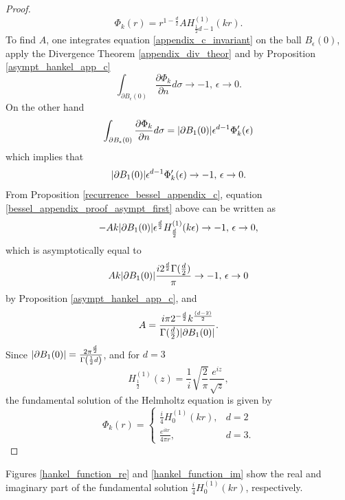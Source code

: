\begin{proof}
    \[
        \Phi_k(r) = r^{1-\frac{d}{2}} A H^{(1)}_{\frac{1}{2}d-1}(kr).
    \]
    To find \(A\), one integrates equation \eqref{appendix_c_invariant} on the ball \(B_\epsilon(0)\), apply the Divergence Theorem \ref{appendix_div_theor} and by Proposition \ref{asympt_hankel_app_c}
    \[
        \int_{\partial B_\epsilon(0)} \frac{\partial \Phi_k}{\partial n}d \sigma \rightarrow -1, \, \epsilon \rightarrow 0.
    \] 
    On the other hand
    \[
        \int_{\partial B_\epsilon(0)} \frac{\partial \Phi_k}{\partial n}d \sigma = \abs{\partial B_1(0)} \epsilon^{d-1}\Phi_k'(\epsilon)
    \]
    which implies that
    \begin{equation}\label{bessel_appendix_proof_asympt_first}
        \abs{\partial B_1(0)} \epsilon^{d-1}\Phi_k'(\epsilon) \rightarrow -1, \, \epsilon \rightarrow 0.
    \end{equation}
    From Proposition \ref{recurrence_bessel_appendix_c}, equation \eqref{bessel_appendix_proof_asympt_first} above can be written as
    \[
        -A k  \abs{\partial B_1(0)} \epsilon^{\frac{d}{2}}H^{(1)}_{\frac{d}{2}}(k \epsilon) \rightarrow -1, \, \epsilon \rightarrow 0,
    \]
    which is asymptotically equal to
    \[
        A k \abs{\partial B_1(0)} \frac{i 2^{\frac{d}{2}} \Gamma(\frac{d}{2})}{\pi}  \rightarrow -1, \, \epsilon \rightarrow 0
    \]
    by Proposition \ref{asympt_hankel_app_c}, and
    \[
        A = \frac{i \pi 2^{-\frac{d}{2}}k^{\frac{(d-2)}{2}}}{\Gamma(\frac{d}{2})\abs{\partial B_1(0)}}.
    \]
    Since \(\abs{\partial B_1(0)} = \frac{2 \pi^{\frac{d}{2}}}{\Gamma\left(\frac{1}{2}d\right)}\), 
    and for \(d=3\)
    \[
        H^{(1)}_{\frac{1}{2}}(z) = \frac{1}{i}\sqrt{\frac{2}{\pi}}\frac{e^{i z}}{\sqrt{z}},
    \]
    the fundamental solution of the Helmholtz equation is given by
    \[
        \Phi_k(r) = \begin{cases}
            \frac{i}{4} H_0^{(1)}(k r), & d=2\\
            \frac{e^{i k r}}{4 \pi r}, & d = 3.
        \end{cases}    
    \]
\end{proof}

Figures \ref{hankel_function_re} and \ref{hankel_function_im} show the real and imaginary part of the fundamental solution \(\frac{i}{4} H_0^{(1)}(k r)\), respectively.

